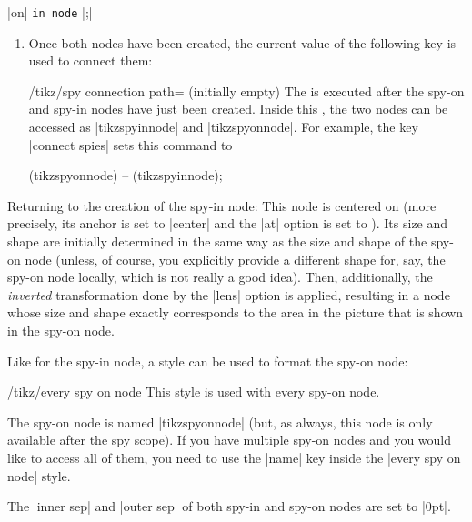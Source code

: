 \begin{command}{\spy {} |on| 
    \texttt{in node} |;|}
\begin{enumerate}
  \item Once both nodes have been created, the current value of the
    following key is used to connect them:
    \begin{key}{/tikz/spy connection path= (initially
        \normalfont empty)}
      The  is executed after the spy-on and spy-in nodes
      have just been created. Inside this , the two nodes
      can be accessed as |tikzspyinnode| and  |tikzspyonnode|.
      For example, the key |connect spies| sets this command to
\begin{codeexample}
\draw[thin] (tikzspyonnode) -- (tikzspyinnode);
\end{codeexample}
    \end{key}
  \end{enumerate}
  Returning to the creation of the spy-in node: This node is centered on
   (more precisely, its anchor is set to |center| and
  the |at| option is set to ). Its size and shape are
  initially determined in the same way as the size and shape of the
  spy-on node (unless, of course, you explicitly provide a different
  shape for, say, the spy-on node locally, which is not really a good
  idea). Then, additionally, the \emph{inverted} transformation done
  by the |lens| option is applied, resulting in a node whose size and
  shape exactly corresponds to the area in the picture that is shown
  in the spy-on node.
\begin{codeexample}[]
\end{codeexample}

  Like for the spy-in node, a style can be used to format the spy-on
  node:
  \begin{stylekey}{/tikz/every spy on node}
    This style is used with every spy-on node.
  \end{stylekey}
  The spy-on node is named |tikzspyonnode| (but, as always, this node
  is only available after the spy scope). If you have multiple
  spy-on nodes and you would like to access all of them, you need to
  use the |name| key inside the |every spy on node| style.

  The |inner sep| and |outer sep| of both spy-in and spy-on nodes are
  set to |0pt|.
\end{command}



